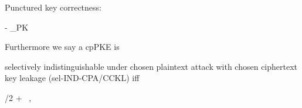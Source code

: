 \begin{definition}
\begin{sitemize}
        \item Punctured key correctness:
        \begin{bralign}
             - \alpha_{\textsf{PK}}\parr{\secpar}
        \end{bralign}
    \end{sitemize}
    Furthermore we say a cpPKE is
    \begin{sitemize}
        \item selectively indistinguishable under chosen plaintext attack with chosen ciphertext key leakage (sel-IND-CPA/CCKL) iff
        \begin{bralign}
            /2 + \varepsilon\parr{\secpar}
            \ ,
        \end{bralign}


\end{sitemize}
\end{definition}
